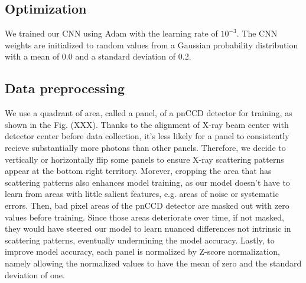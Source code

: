 \subsection{Optimization}


We trained our CNN using Adam \cite{kingmaAdamMethodStochastic2017} with the
learning rate of $10^{-3}$.  The CNN weights are initialized to random values
from a Gaussian probability distribution with a mean of $0.0$ and a standard
deviation of $0.2$.  

\subsection{Data preprocessing}

We use a quadrant of area, called a panel, of a pnCCD detector for training, as
shown in the Fig. (XXX).  Thanks to the alignment of X-ray beam center with
detector center before data collection, it's less likely for a panel to
consistently recieve substantially more photons than other panels.  Therefore,
we decide to vertically or horizontally flip some panels to ensure X-ray
scattering patterns appear at the bottom right territory.  Morever, cropping the
area that has scattering patterns also enhances model training, as our model
doesn't have to learn from areas with little salient features, e.g. areas of
noise or systematic errors.  Then, bad pixel areas of the pnCCD detector are
masked out with zero values before training.  Since those areas deteriorate over
time, if not masked, they would have steered our model to learn nuanced
differences not intrinsic in scattering patterns, eventually undermining the
model accuracy. Lastly, to improve model accuracy, each panel is normalized by
Z-score normalization, namely allowing the normalized values to have the mean of
zero and the standard deviation of one.  

